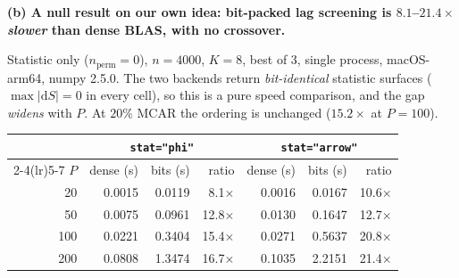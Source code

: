 \textbf{(b) A null result on our own idea: bit-packed lag screening is
$8.1$--$21.4\times$ \emph{slower} than dense BLAS, with no crossover.}
{\footnotesize Statistic only ($n_{\text{perm}}{=}0$), $n{=}4000$, $K{=}8$, best of
3, single process, macOS-arm64, numpy 2.5.0. The two backends return
\emph{bit-identical} statistic surfaces ($\max|\mathrm{d}S| = 0$ in every cell), so this
is a pure speed comparison, and the gap \emph{widens} with $P$. At $20\%$ MCAR the
ordering is unchanged ($15.2\times$ at $P{=}100$).\par}
\vspace{2pt}
{\centering\footnotesize
\setlength{\tabcolsep}{4pt}
\begin{tabular}{@{}rrrrrrr@{}}
\toprule
 & \multicolumn{3}{c}{\texttt{stat="phi"}} & \multicolumn{3}{c}{\texttt{stat="arrow"}} \\
\cmidrule(lr){2-4}\cmidrule(lr){5-7}
$P$ & dense (s) & bits (s) & ratio & dense (s) & bits (s) & ratio \\
\midrule
20 & 0.0015 & 0.0119 & 8.1$\times$ & 0.0016 & 0.0167 & 10.6$\times$ \\
50 & 0.0075 & 0.0961 & 12.8$\times$ & 0.0130 & 0.1647 & 12.7$\times$ \\
100 & 0.0221 & 0.3404 & 15.4$\times$ & 0.0271 & 0.5637 & 20.8$\times$ \\
200 & 0.0808 & 1.3474 & 16.7$\times$ & 0.1035 & 2.2151 & 21.4$\times$ \\
\bottomrule
\end{tabular}\par}

